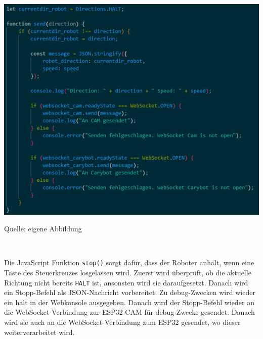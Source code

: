 \documentclass[ngerman,12pt,a4paper]{article}
\begin{document}
	\begin{center}
		\begin{minipage}[t]{0.75\textwidth}
			\includegraphics[scale=0.7]{Pictures/Steuerung-js3}
			\label{fig:Steuerkreuz-js3}
			\vspace{-10pt}
			\begin{center}
				\par\small Quelle: eigene Abbildung 
			\end{center}
		\end{minipage} \\[0.75cm]
	\end{center}
	Die JavaScript Funktion \texttt{stop()} sorgt dafür, dass der Roboter anhält, wenn eine Taste des Steuerkreuzes losgelassen wird. Zuerst wird überprüft, ob die aktuelle Richtung nicht bereits \texttt{HALT} ist, ansonsten wird sie daraufgesetzt. Danach wird ein Stopp-Befehl als JSON-Nachricht vorbereitet. Zu debug-Zwecken wird wieder ein halt in der Webkonsole ausgegeben. Danach wird der Stopp-Befehl wieder an die WebSocket-Verbindung zur ESP32-CAM für debug-Zwecke gesendet. Danach wird sie auch an die WebSocket-Verbindung zum ESP32 gesendet, wo dieser weiterverarbeitet wird. \\[0.5cm]
\end{document}

